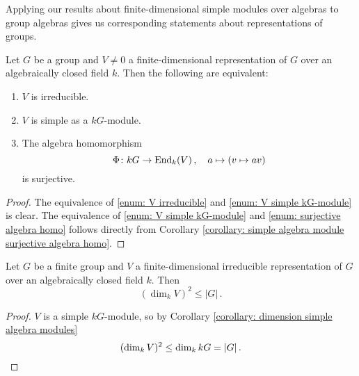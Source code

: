Applying our results about finite-dimensional simple modules over algebras to group algebras gives us corresponding statements about representations of groups.


\begin{lemma}\label{lemma: equivalence to irreducible}
  Let $G$ be a group and $V \neq 0$ a finite-dimensional representation of $G$ over an algebraically closed field $k$. Then the following are equivalent:
  \begin{enumerate}[label=\emph{\roman*)},leftmargin=*]
    \item \label{enum: V irreducible}
      $V$ is irreducible.
    \item \label{enum: V simple kG-module}
      $V$ is simple as a $kG$-module.
    \item \label{enum: surjective algebra homo}
      The algebra homomorphism
      \[
                \Phi
        \colon  kG
        \to     \operatorname{End}_k(V) \,,
        \quad   a
        \mapsto (v \mapsto av)
      \]
      is surjective.
  \end{enumerate}
\end{lemma}
\begin{proof}
  The equivalence of \ref{enum: V irreducible} and \ref{enum: V simple kG-module} is clear.
  The equivalence of \ref{enum: V simple kG-module} and \ref{enum: surjective algebra homo} follows directly from Corollary \ref{corollary: simple algebra module surjective algebra homo}.
\end{proof}


\begin{corollary}
  Let $G$ be a finite group and $V$ a finite-dimensional irreducible representation of $G$ over an algebraically closed field $k$.
  Then
  \[
          \left( \dim_k V \right)^2
    \leq |G| \,.
  \]
\end{corollary}
\begin{proof}
  $V$ is a simple $kG$-module, so by Corollary \ref{corollary: dimension simple algebra modules}
  \[
          (\dim_k V)^2
    \leq  \dim_k kG
    =     |G| \,.
    \qedhere
  \]
\end{proof}


